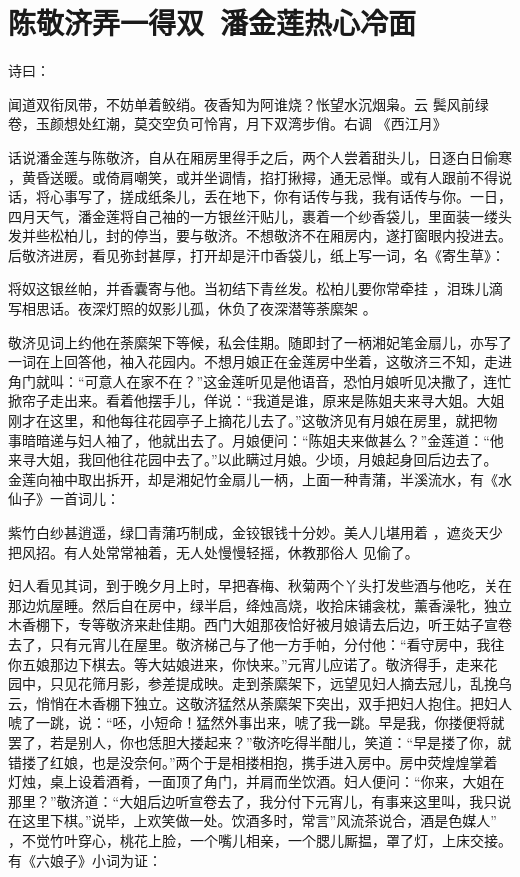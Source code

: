 \chapter{陈敬济弄一得双~潘金莲热心冷面}

诗曰：

闻道双衔凤带，不妨单着鲛绡。夜香知为阿谁烧？怅望水沉烟枭。云
鬓风前绿卷，玉颜想处红潮，莫交空负可怜宵，月下双湾步俏。右调
《西江月》

话说潘金莲与陈敬济，自从在厢房里得手之后，两个人尝着甜头儿，日逐白日偷寒
，黄昏送暖。或倚肩嘲笑，或并坐调情，掐打揪撏，通无忌惮。或有人跟前不得说
话，将心事写了，搓成纸条儿，丢在地下，你有话传与我，我有话传与你。一日，
四月天气，潘金莲将自己袖的一方银丝汗贴儿，裹着一个纱香袋儿，里面装一缕头
发并些松柏儿，封的停当，要与敬济。不想敬济不在厢房内，遂打窗眼内投进去。
后敬济进房，看见弥封甚厚，打开却是汗巾香袋儿，纸上写一词，名《寄生草》：

将奴这银丝帕，并香囊寄与他。当初结下青丝发。松柏儿要你常牵挂
，泪珠儿滴写相思话。夜深灯照的奴影儿孤，休负了夜深潜等荼縻架
。

敬济见词上约他在荼縻架下等候，私会佳期。随即封了一柄湘妃笔金扇儿，亦写了
一词在上回答他，袖入花园内。不想月娘正在金莲房中坐着，这敬济三不知，走进
角门就叫：“可意人在家不在？”这金莲听见是他语音，恐怕月娘听见决撒了，连忙
掀帘子走出来。看着他摆手儿，佯说：“我道是谁，原来是陈姐夫来寻大姐。大姐
刚才在这里，和他每往花园亭子上摘花儿去了。”这敬济见有月娘在房里，就把物
事暗暗递与妇人袖了，他就出去了。月娘便问：“陈姐夫来做甚么？”金莲道：“他
来寻大姐，我回他往花园中去了。”以此瞒过月娘。少顷，月娘起身回后边去了。
金莲向袖中取出拆开，却是湘妃竹金扇儿一柄，上面一种青蒲，半溪流水，有《水
仙子》一首词儿：

紫竹白纱甚逍遥，绿囗青蒲巧制成，金铰银钱十分妙。美人儿堪用着
，遮炎天少把风招。有人处常常袖着，无人处慢慢轻摇，休教那俗人
见偷了。

妇人看见其词，到于晚夕月上时，早把春梅、秋菊两个丫头打发些酒与他吃，关在
那边炕屋睡。然后自在房中，绿半启，绛烛高烧，收拾床铺衾枕，薰香澡牝，独立
木香棚下，专等敬济来赴佳期。西门大姐那夜恰好被月娘请去后边，听王姑子宣卷
去了，只有元宵儿在屋里。敬济梯己与了他一方手帕，分付他：“看守房中，我往
你五娘那边下棋去。等大姑娘进来，你快来。”元宵儿应诺了。敬济得手，走来花
园中，只见花筛月影，参差提成映。走到荼縻架下，远望见妇人摘去冠儿，乱挽乌
云，悄悄在木香棚下独立。这敬济猛然从荼縻架下突出，双手把妇人抱住。把妇人
唬了一跳，说：“呸，小短命！猛然外事出来，唬了我一跳。早是我，你搂便将就
罢了，若是别人，你也恁胆大搂起来？”敬济吃得半酣儿，笑道：“早是搂了你，就
错搂了红娘，也是没奈何。”两个于是相搂相抱，携手进入房中。房中荧煌煌掌着
灯烛，桌上设着酒肴，一面顶了角门，并肩而坐饮酒。妇人便问：“你来，大姐在
那里？”敬济道：“大姐后边听宣卷去了，我分付下元宵儿，有事来这里叫，我只说
在这里下棋。”说毕，上欢笑做一处。饮酒多时，常言”风流茶说合，酒是色媒人”
，不觉竹叶穿心，桃花上脸，一个嘴儿相亲，一个腮儿厮揾，罩了灯，上床交接。
有《六娘子》小词为证：

